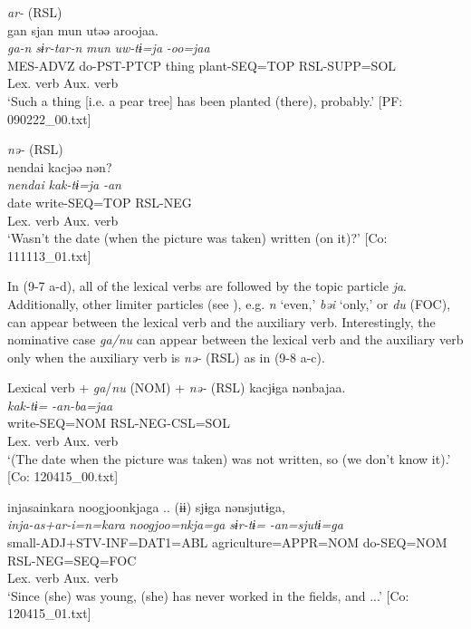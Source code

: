 \ex \textit{ar-} (RSL)\label{ex:9.7c}\\
    \gllll     gan  sjan  mun  utəə  aroojaa.\\
      \textit{ga-n}  \textit{sɨr-tar-n}  \textit{mun}  \textit{uw-tɨ=ja}  \textit{-oo=jaa}\\
      MES-ADVZ  do-PST-PTCP  thing  plant-SEQ=TOP  RSL-SUPP=SOL\\
            Lex. verb  Aux. verb\\
      \glt       ‘Such a thing [i.e. a pear tree] has been planted (there), probably.’ [PF: 090222\_00.txt]
  
\ex \textit{nə-} (RSL) \label{ex:9.7d}\\
    \gllll    {\textbar}nendai{\textbar}  kacjəə  nən?\\
      \textit{nendai}  \textit{kak-tɨ=ja}  \textit{-an}\\
      date  write-SEQ=TOP  RSL-NEG\\
        Lex. verb  Aux. verb\\
      \glt       ‘Wasn’t the date (when the picture was taken) written (on it)?’ [Co: 111113\_01.txt]
    \z
\z

In (9-7 a-d), all of the lexical verbs are followed by the topic particle \textit{ja}. Additionally, other limiter particles (see ), e.g. \textit{n} ‘even,’ \textit{bəi} ‘only,’ or \textit{du} (FOC), can appear between the lexical verb and the auxiliary verb. Interestingly, the nominative case \textit{ga/nu} can appear between the lexical verb and the auxiliary verb only when the auxiliary verb is \textit{nə-} (RSL) as in (9-8 a-c).

\ea   Lexical verb + \textit{ga}/\textit{nu} (NOM) + \textit{nə-} (RSL) \label{ex:9.8}
\ea %
 \gllll  kacjɨga  nənbajaa.\\
      \textit{kak-tɨ=}  \textit{-an-ba=jaa}\\
      write-SEQ=NOM  RSL-NEG-CSL=SOL\\
      Lex. verb  Aux. verb\\
      \glt       ‘(The date when the picture was taken) was not written, so (we don’t know it).’ [Co: 120415\_00.txt]

\ex \label{ex:9.8b} %
    \gllll  injasainkara  noogjoonkjaga ..  (ɨɨ)                   sjɨga  nənsjutɨga,\\
      \textit{inja-as+ar-i=n=kara}  \textit{noogjoo=nkja=ga}            \textit{sɨr-tɨ=}  \textit{-an=sjutɨ=ga}\\
      small-ADJ+STV-INF=DAT1=ABL  agriculture=APPR=NOM                  do-SEQ=NOM  RSL-NEG=SEQ=FOC\\
                                                                        Lex. verb  Aux. verb\\
      \glt       ‘Since (she) was young, (she) has never worked in the fields, and ...’ [Co: 120415\_01.txt]

